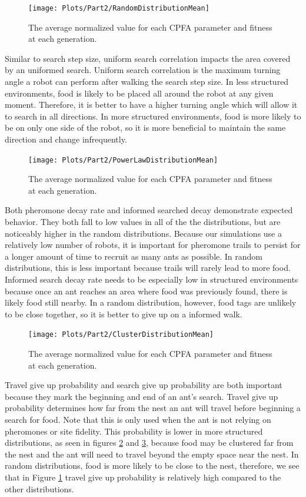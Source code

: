 \documentclass{acm_proc_article-sp}
\begin{document}
\begin{figure}[h]
\texttt{[image: Plots/Part2/RandomDistributionMean]}
\caption{The average normalized value for each CPFA parameter and fitness at each generation.} \label{fig:randMean}
\end{figure}

Similar to search step size, uniform search correlation impacts the area covered by an uniformed search. Uniform search correlation is the maximum turning angle a robot can perform after walking the search step size. In less structured environments, food is likely to be placed all around the robot at any given moment. Therefore, it is better to have a higher turning angle which will allow it to search in all directions. In more structured environments, food is more likely to be on only one side of the robot, so it is more beneficial to maintain the same direction and change infrequently. 

\begin{figure}[h]
\texttt{[image: Plots/Part2/PowerLawDistributionMean]}
\caption{The average normalized value for each CPFA parameter and fitness at each generation.} \label{fig:PowerLawMean}
\end{figure}

Both pheromone decay rate and informed searched decay demonstrate expected behavior. They both fall to low values in all of the the distributions, but are noticeably higher in the random distributions. Because our simulations use a relatively low number of robots, it is important for pheromone trails to persist for a longer amount of time to recruit as many ants as possible. In random distributions, this is less important because trails will rarely lead to more food. Informed search decay rate needs to be especially low in structured environments because once an ant reaches an area where food was previously found, there is likely food still nearby. In a random distribution, however, food tags are unlikely to be close together, so it is better to give up on a informed walk.

\begin{figure}[h]
\texttt{[image: Plots/Part2/ClusterDistributionMean]}
\caption{The average normalized value for each CPFA parameter and fitness at each generation.} \label{fig:clusterMean}
\end{figure}

Travel give up probability and search give up probability are both important because they mark the beginning and end of an ant's search. Travel give up probability determines how far from the nest an ant will travel before beginning a search for food. Note that this is only used when the ant is not relying on pheromones or site fidelity. This probability is lower in more structured distributions, as seen in figures \ref{fig:PowerLawMean} and \ref{fig:clusterMean}, because food may be clustered far from the nest and the ant will need to travel beyond the empty space near the nest. In random distributions, food is more likely to be close to the nest, therefore, we see that in Figure \ref{fig:randMean} travel give up probability is relatively high compared to the other distributions.
\end{document}
